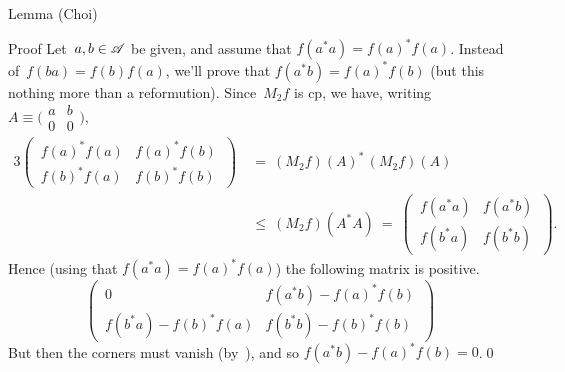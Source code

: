 \documentclass[a]{subfiles}
\begin{document}
\begin{parsec}
\begin{point}[choi]{Lemma (Choi)}
\begin{point}{Proof}
Let~$a,b\in \mathscr{A}$ be given,
and assume that $f(a^*a)=f(a)^*f(a)$.
Instead of~$f(ba)=f(b)f(a)$,
we'll prove that $f(a^*b)=f(a)^*f(b)$
(but this nothing more than  a reformution).
Since~$M_2f$ is cp,
we have, writing 
$A\equiv\bigl(\begin{smallmatrix}a&b\\0&0\end{smallmatrix}\bigr)$,
\begin{alignat*}{3}
\left(\,\begin{matrix}f(a)^*f(a)&f(a)^*f(b)\\
f(b)^*f(a)&f(b)^*f(b)\end{matrix}\,\right) 
	\ &=\ (M_2f)(A)^*\,(M_2f)(A)\\
\ &\leq\ (M_2f)(A^*A) \ =\ 
\left(\,\begin{matrix}f(a^*a)&f(a^*b)\\
f(b^*a)&f(b^*b)\end{matrix}\,\right).
\end{alignat*}
Hence
(using that $f(a^*a)=f(a)^*f(a)$)
the following matrix is positive.
\begin{equation*}
\left(\,\begin{matrix}
0 & f(a^*b) - f(a)^*f(b) \\
f(b^*a)-f(b)^*f(a) & f(b^*b)-f(b)^*f(b)
\end{matrix}\,\right)
\end{equation*}
But then
the corners must vanish
(by~),
and so
$f(a^*b)-f(a)^*f(b)=0$.\qed
\end{point}
\end{point}
\end{parsec}
\end{document}
